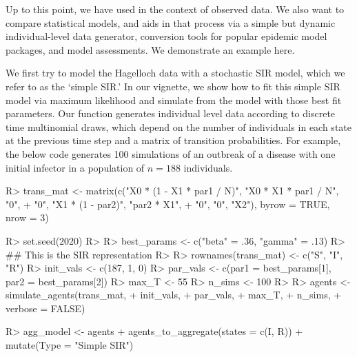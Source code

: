 \documentclass[
  shortnames]{jss}
\begin{document}
Up to this point, we have used  in the context of
observed data. We also want to compare statistical models, and
 aids in that process via a simple but dynamic
individual-level data generator, conversion tools for popular epidemic
model packages, and model assessments. We demonstrate an example here.

We first try to model the Hagelloch data with a stochastic SIR model,
which we refer to as the `simple SIR.' In our vignette, we show how to
fit this simple SIR model via maximum likelihood and simulate from the
model with those best fit parameters. Our function
 generates individual level data according to
discrete time multinomial draws, which depend on the number of
individuals in each state at the previous time step and a matrix of
transition probabilities. For example, the below code generates 100
simulations of an outbreak of a disease with one initial infector in a
population of \(n= 188\) individuals.

\begin{CodeChunk}
\begin{CodeInput}
R> trans_mat <- matrix(c("X0 * (1 - X1 * par1 / N)", "X0 * X1  * par1 / N", "0",
+                   "0", "X1 * (1 - par2)", "par2 * X1",
+                   "0", "0", "X2"), byrow = TRUE, nrow = 3)
\end{CodeInput}
\end{CodeChunk}

\begin{CodeChunk}
\begin{CodeInput}
R> set.seed(2020)
R> 
R> best_params <- c("beta" = .36, "gamma" = .13)
R> ## This is the SIR representation
R> 
R> rownames(trans_mat) <- c("S", "I", "R")
R> init_vals <- c(187, 1, 0)
R> par_vals <- c(par1 = best_params[1], par2 = best_params[2])
R> max_T <- 55
R> n_sims <- 100
R> 
R> agents <- simulate_agents(trans_mat,
+                        init_vals,
+                        par_vals,
+                        max_T,
+                        n_sims,
+                        verbose = FALSE)
\end{CodeInput}
\end{CodeChunk}

\begin{CodeChunk}
\begin{CodeInput}
R> agg_model <- agents %
+   agents_to_aggregate(states = c(I, R)) %
+   mutate(Type = "Simple SIR")
\end{CodeInput}
\end{CodeChunk}
\end{document}
